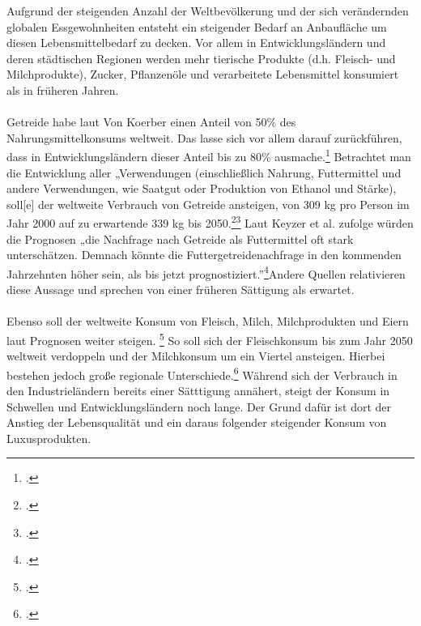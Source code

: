 \documentclass{scrartcl}
\begin{document}
Aufgrund der steigenden Anzahl der Weltbevölkerung und der sich verändernden globalen Essgewohnheiten entsteht ein steigender Bedarf an Anbaufläche um diesen Lebensmittelbedarf zu decken. Vor allem in Entwicklungsländern und deren städtischen Regionen werden mehr tierische Produkte (d.h. Fleisch- und Milchprodukte), Zucker, Pflanzenöle und verarbeitete Lebensmittel konsumiert als in früheren Jahren. \\
\\Getreide habe laut Von Koerber einen Anteil von 50\% des Nahrungsmittelkonsums weltweit. Das lasse sich vor allem darauf zurückführen, dass in Entwicklungsländern dieser Anteil bis zu 80\% ausmache.\footcite[Vgl.][S.4ff]{VonKoerber2008Globale-trends}
Betrachtet man die Entwicklung aller „Verwendungen (einschließlich Nahrung, Futtermittel und andere Verwendungen, wie Saatgut oder Produktion von Ethanol und Stärke), soll[e] der weltweite Verbrauch von Getreide ansteigen, von 309 kg pro Person im Jahr 2000 auf zu erwartende 339 kg bis 2050.\footcite[S.3ff]{VonKoerber2008Globale-trends}\footcite[vgl.][S.23ff]{FAO2006World2030/2050} 
Laut Keyzer et al. zufolge würden die Prognosen „die Nachfrage nach Getreide als Futtermittel oft stark unterschätzen. Demnach könnte die Futtergetreidenachfrage in den kommenden Jahrzehnten höher sein, als bis jetzt prognostiziert.”\footcite[S.3f]{VonKoerber2008Globale-trends}Andere Quellen relativieren diese Aussage und sprechen von einer früheren Sättigung als erwartet.\\
\\
Ebenso soll der weltweite Konsum von Fleisch, Milch, Milchprodukten und Eiern laut Prognosen weiter steigen. \footcite[Vgl.][S.4f]{VonKoerber2008Globale-trends} So soll sich der Fleischkonsum bis zum Jahr 2050 weltweit verdoppeln und der Milchkonsum um ein Viertel ansteigen. Hierbei bestehen jedoch große regionale Unterschiede.\footcite[Vgl.][S.4]{VonKoerber2008Globale-trends} Während sich der Verbrauch in den Industrieländern bereits einer Sätttigung annähert, steigt der Konsum in Schwellen und Entwicklungsländern noch lange. Der Grund dafür ist dort der Anstieg der Lebensqualität und ein daraus folgender steigender Konsum von Luxusprodukten.
\end{document}
